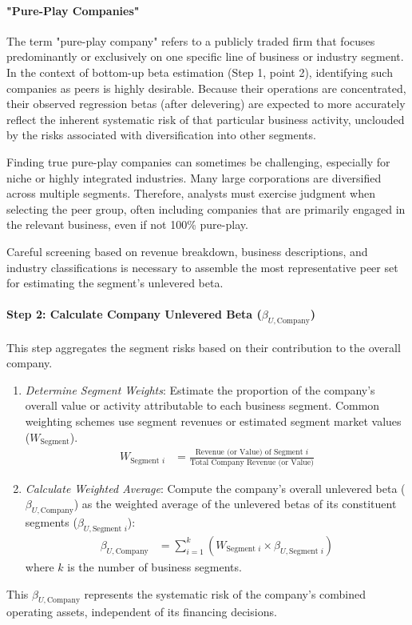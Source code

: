 \paragraph{"Pure-Play Companies"} \label{par:pure_play_companies}
The term "pure-play company" refers to a publicly traded firm that focuses predominantly or exclusively on one specific line of business or industry segment. In the context of bottom-up beta estimation (Step 1, point 2), identifying such companies as peers is highly desirable. Because their operations are concentrated, their observed regression betas (after delevering) are expected to more accurately reflect the inherent systematic risk of that particular business activity, unclouded by the risks associated with diversification into other segments.

Finding true pure-play companies can sometimes be challenging, especially for niche or highly integrated industries. Many large corporations are diversified across multiple segments. Therefore, analysts must exercise judgment when selecting the peer group, often including companies that are primarily engaged in the relevant business, even if not 100\% pure-play.

Careful screening based on revenue breakdown, business descriptions, and industry classifications is necessary to assemble the most representative peer set for estimating the segment's unlevered beta.

\paragraph{Step 2: Calculate Company Unlevered Beta (\(\beta_{U, \text{Company}}\))}
This step aggregates the segment risks based on their contribution to the overall company.
\begin{enumerate}
    \item \textit{Determine Segment Weights}: Estimate the proportion of the company's overall value or activity attributable to each business segment. Common weighting schemes use segment revenues or estimated segment market values (\(W_{\text{Segment}}\)).
          \begin{align*}
              W_{\text{Segment } i} & = \frac{\text{Revenue (or Value) of Segment } i}{\text{Total Company Revenue (or Value)}}
          \end{align*}
    \item \textit{Calculate Weighted Average}: Compute the company's overall unlevered beta (\(\beta_{U, \text{Company}}\)) as the weighted average of the unlevered betas of its constituent segments (\(\beta_{U, \text{Segment } i}\)):
          \begin{align*}
              \beta_{U, \text{Company}} & = \sum_{i=1}^{k} (W_{\text{Segment } i} \times \beta_{U, \text{Segment } i})
          \end{align*}
          where \(k\) is the number of business segments.
\end{enumerate}
This \(\beta_{U, \text{Company}}\) represents the systematic risk of the company's combined operating assets, independent of its financing decisions.

